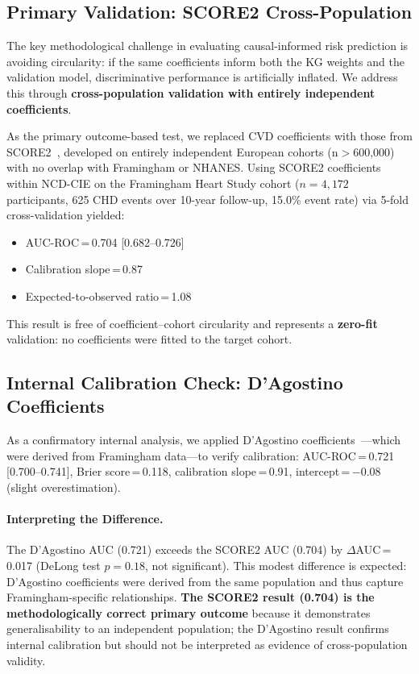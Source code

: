 \documentclass[runningheads]{llncs}
\begin{document}
\subsection{Primary Validation: SCORE2 Cross-Population}\label{sec:score2}

The key methodological challenge in evaluating causal-informed risk
prediction is avoiding circularity: if the same coefficients inform
both the KG weights and the validation model, discriminative performance
is artificially inflated.
We address this through \textbf{cross-population validation with
entirely independent coefficients}.

As the primary outcome-based test, we replaced CVD coefficients with
those from SCORE2~\cite{score22021}, developed on entirely
independent European cohorts (n$>$600,000) with no overlap with
Framingham or NHANES.
Using SCORE2 coefficients within NCD-CIE on the Framingham Heart
Study cohort ($n = 4{,}172$ participants, 625 CHD events over
10-year follow-up, 15.0\% event rate) via 5-fold cross-validation
yielded:
\begin{itemize}
\item AUC-ROC\,=\,0.704 [0.682--0.726]
\item Calibration slope\,=\,0.87
\item Expected-to-observed ratio\,=\,1.08
\end{itemize}
This result is free of coefficient--cohort circularity and represents
a \textbf{zero-fit} validation: no coefficients were fitted to the
target cohort.

\subsection{Internal Calibration Check: D'Agostino Coefficients}\label{sec:dagostino}

As a confirmatory internal analysis, we applied D'Agostino
coefficients~\cite{dagostino2008}---which were derived from
Framingham data---to verify calibration:
AUC-ROC\,=\,0.721 [0.700--0.741],
Brier score\,=\,0.118,
calibration slope\,=\,0.91,
intercept\,=\,$-$0.08 (slight overestimation).

\paragraph{Interpreting the Difference.}
The D'Agostino AUC (0.721) exceeds the SCORE2 AUC (0.704) by
$\Delta$AUC\,=\,0.017 (DeLong test $p = 0.18$, not significant).
This modest difference is expected: D'Agostino coefficients were
derived from the same population and thus capture Framingham-specific
relationships.
\textbf{The SCORE2 result (0.704) is the methodologically correct
primary outcome} because it demonstrates generalisability to an
independent population; the D'Agostino result confirms internal
calibration but should not be interpreted as evidence of
cross-population validity.
\end{document}
